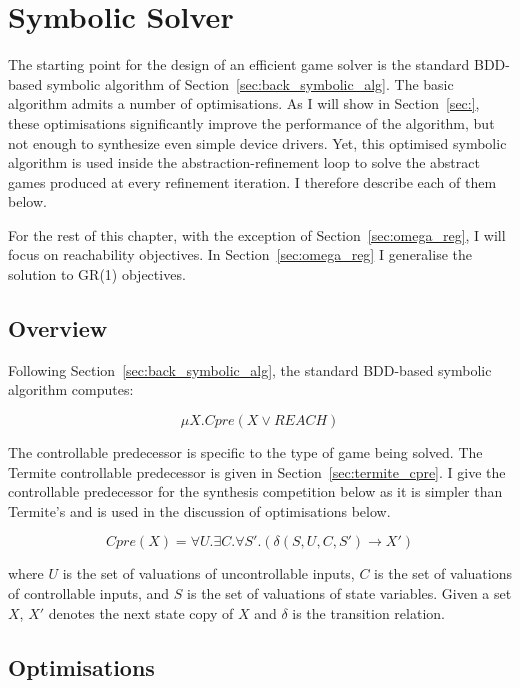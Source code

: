 \section{Symbolic Solver}
\label{sec:syntcomp}

The starting point for the design of an efficient game solver is the standard BDD-based symbolic algorithm of Section~\ref{sec:back_symbolic_alg}. The basic algorithm admits a number of optimisations. As I will show in Section~\ref{sec:}, these optimisations significantly improve the performance of the algorithm, but not enough to synthesize even simple device drivers. Yet, this optimised symbolic algorithm is used inside the abstraction-refinement loop to solve the abstract games produced at every refinement iteration. I therefore describe each of them below.

For the rest of this chapter, with the exception of Section~\ref{sec:omega_reg}, I will focus on reachability objectives. In Section~\ref{sec:omega_reg} I generalise the solution to GR(1) objectives. 

\subsection{Overview}
Following Section~\ref{sec:back_symbolic_alg}, the standard BDD-based symbolic algorithm computes:

\begin{equation}
\label{eqn:mu_syntcomp}
\mu X. Cpre(X \lor REACH)
\end{equation}

The controllable predecessor is specific to the type of game being solved. The Termite controllable predecessor is given in Section~\ref{sec:termite_cpre}. I give the controllable predecessor for the synthesis competition below as it is simpler than Termite's and is used in the discussion of optimisations below.

\begin{equation}
\label{eqn:cpre_syntcomp}
Cpre(X) = \forall U. \exists C. \forall S'. (\delta(S, U, C, S') \rightarrow X')
\end{equation}

\noindent where $U$ is the set of valuations of uncontrollable inputs, $C$ is the set of valuations of controllable inputs, and $S$ is the set of valuations of state variables. Given a set $X$, $X'$ denotes the next state copy of $X$ and $\delta$ is the transition relation.

\subsection{Optimisations}
\label{sec:syntcomp_optimisations}

